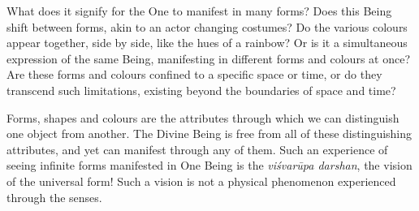 \newpage
\begin{mananam}{}
\normalfont\mananamtext What does it signify for the One to manifest in many forms? Does this Being shift between forms, akin to an actor changing costumes? Do the various colours appear together, side by side, like the hues of a rainbow? Or is it a simultaneous expression of the same Being, manifesting in different forms and colours at once? Are these forms and colours confined to a specific space or time, or do they transcend such limitations, existing beyond the boundaries of space and time?
\end{mananam}
\sreflect
\begin{inspiration}{}
\normalfont\mananamtext Forms, shapes and colours are the attributes through which we can distinguish one object from another. The Divine Being is free from all of these distinguishing attributes, and yet can manifest through any of them. Such an experience of seeing infinite forms manifested in One Being is the \emph{viśvarūpa darshan}, the vision of the universal form! Such a vision is not a physical phenomenon experienced through the senses.
\end{inspiration}
\newpage

